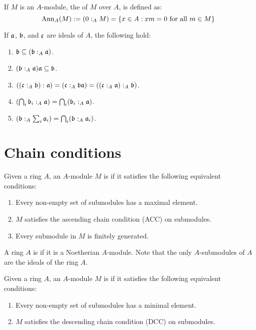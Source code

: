 \documentclass{ximera}
\begin{document}
\begin{definition} If $M$ is an $A$-module, the  of $M$ over $A$, is defined as:
\[
\operatorname{Ann}_A(M) := (0:_A M)  =  \{ x\in A: xm = 0 \text{ for all } m \in M\}
\]
\end{definition}

\begin{proposition} If $\mathfrak{a}$, $\mathfrak{b}$, and $\mathfrak c$ are ideals of $A$, the following hold:
\begin{enumerate}
\item $\mathfrak{b}\subseteq (\mathfrak{b}:_A \mathfrak{a})$.
\item $(\mathfrak{b}:_A \mathfrak{a}) \mathfrak{a} \subseteq \mathfrak{b}$.
\item $((\mathfrak c:_A \mathfrak{b}) : \mathfrak{a})= (\mathfrak c :_A \mathfrak{b} \mathfrak{a}) = ((\mathfrak c :_A \mathfrak{a}):_A \mathfrak{b})$.
\item $\left(\bigcap_i \mathfrak{b}_i:_A \mathfrak{a}\right) = \bigcap_i(\mathfrak{b}_i:_A \mathfrak{a})$.
\item $\left(\mathfrak{b}:_A\sum_i \mathfrak{a}_i\right) = \bigcap_i(\mathfrak{b}:_A \mathfrak{a}_i)$.
\end{enumerate}
\end{proposition}



\section{Chain conditions}

\begin{definition} Given a ring $A$, an $A$-module $M$ is  if it satisfies the following equivalent conditions:
\begin{enumerate}
\item Every non-empty set of submodules has a maximal element.
\item $M$ satisfies the ascending chain condition (ACC) on submodules.
\item Every submodule in $M$ is finitely generated.
\end{enumerate}
\end{definition}

\begin{definition} A ring $A$ is  if it is a Noetherian $A$-module. Note that the only $A$-submodules of $A$ are the ideals of the ring $A$.
\end{definition}

\begin{definition} Given a ring $A$, an $A$-module $M$ is  if it satisfies the following equivalent conditions:
\begin{enumerate}
\item Every non-empty set of submodules has a minimal element.
\item $M$ satisfies the descending chain condition (DCC) on submodules.
\end{enumerate}
\end{definition}
\end{document}
